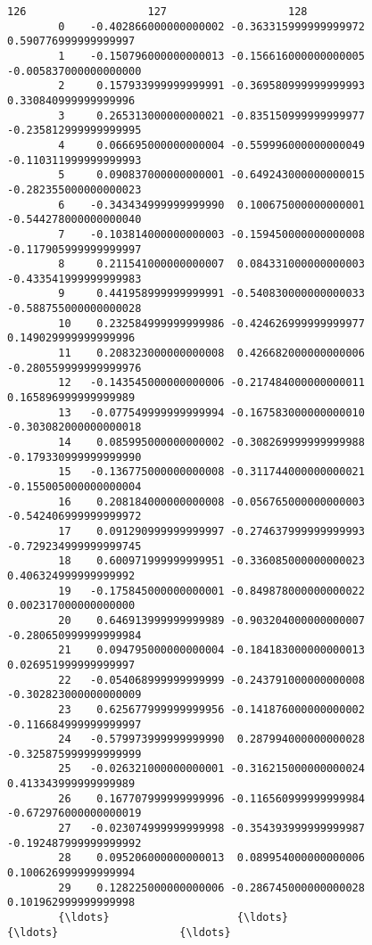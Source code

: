 \documentclass[11pt]{article}
\begin{document}
\begin{Verbatim}[commandchars=\\\{\}]
                               126                   127                   128  
        0    -0.402866000000000002 -0.363315999999999972  0.590776999999999997  
        1    -0.150796000000000013 -0.156616000000000005 -0.005837000000000000  
        2     0.157933999999999991 -0.369580999999999993  0.330840999999999996  
        3     0.265313000000000021 -0.835150999999999977 -0.235812999999999995  
        4     0.066695000000000004 -0.559996000000000049 -0.110311999999999993  
        5     0.090837000000000001 -0.649243000000000015 -0.282355000000000023  
        6    -0.343434999999999990  0.100675000000000001 -0.544278000000000040  
        7    -0.103814000000000003 -0.159450000000000008 -0.117905999999999997  
        8     0.211541000000000007  0.084331000000000003 -0.433541999999999983  
        9     0.441958999999999991 -0.540830000000000033 -0.588755000000000028  
        10    0.232584999999999986 -0.424626999999999977  0.149029999999999996  
        11    0.208323000000000008  0.426682000000000006 -0.280559999999999976  
        12   -0.143545000000000006 -0.217484000000000011  0.165896999999999989  
        13   -0.077549999999999994 -0.167583000000000010 -0.303082000000000018  
        14    0.085995000000000002 -0.308269999999999988 -0.179330999999999990  
        15   -0.136775000000000008 -0.311744000000000021 -0.155005000000000004  
        16    0.208184000000000008 -0.056765000000000003 -0.542406999999999972  
        17    0.091290999999999997 -0.274637999999999993 -0.729234999999999745  
        18    0.600971999999999951 -0.336085000000000023  0.406324999999999992  
        19   -0.175845000000000001 -0.849878000000000022  0.002317000000000000  
        20    0.646913999999999989 -0.903204000000000007 -0.280650999999999984  
        21    0.094795000000000004 -0.184183000000000013  0.026951999999999997  
        22   -0.054068999999999999 -0.243791000000000008 -0.302823000000000009  
        23    0.625677999999999956 -0.141876000000000002 -0.116684999999999997  
        24   -0.579973999999999990  0.287994000000000028 -0.325875999999999999  
        25   -0.026321000000000001 -0.316215000000000024  0.413343999999999989  
        26    0.167707999999999996 -0.116560999999999984 -0.672976000000000019  
        27   -0.023074999999999998 -0.354393999999999987 -0.192487999999999992  
        28    0.095206000000000013  0.089954000000000006  0.100626999999999994  
        29    0.128225000000000006 -0.286745000000000028  0.101962999999999998  
        {\ldots}                    {\ldots}                   {\ldots}                   {\ldots}  

\end{Verbatim}
\end{document}
